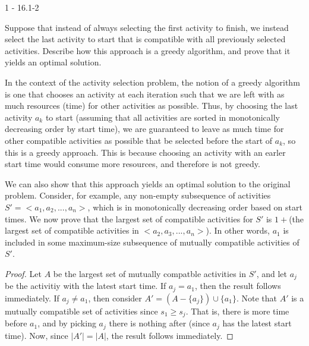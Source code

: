 \documentclass[11pt]{article}
\begin{document}

\begin{prob}{1 - 16.1-2}

Suppose that instead of always selecting the first activity to finish, we instead select the last activity to start that is compatible with all previously selected activities. Describe how this approach is a greedy algorithm, and prove that it yields an optimal solution.
\end{prob}
\begin{sol}

In the context of the activity selection problem, the notion of a greedy algorithm is one that chooses an activity at each iteration such that we are left with as much resources (time) for other activities as possible. Thus, by choosing the last activity $a_k$ to start (assuming that all activities are sorted in monotonically decreasing order by start time), we are guaranteed to leave as much time for other compatible activities as possible that be selected before the start of $a_k$, so this is a greedy approach. This is because choosing an activity with an earler start time would consume more resources, and therefore is not greedy. 

We can also show that this approach yields an optimal solution to the original problem. Consider, for example, any non-empty subsequence of activities $S' = <a_1, a_2, ..., a_n>$, which is in monotonically decreasing order based on start times. We now prove that the largest set of compatible activities for $S'$ is $1 + $(the largest set of compatible activities in $<a_2, a_3,..., a_n>$). In other words, $a_1$ is included in some maximum-size subsequence of mutually compatible activities of $S'$.

\begin{proof}
Let $A$ be the largest set of mutually compatble activities in $S'$, and let $a_j$ be the activitiy with the latest start time. If $a_j = a_1$, then the result follows immediately. If $a_j \not= a_1$, then consider $A' = (A - \{a_j\}) \cup \{a_1\}$. Note that $A'$ is a mutually compatible set of activities since $s_1 \geq s_j$. That is, there is more time before $a_1$, and by picking $a_j$ there is nothing after (since $a_j$ has the latest start time). Now, since $|A'| = |A|$, the result follows immediately.
\end{proof}


\end{sol}
\end{document}
